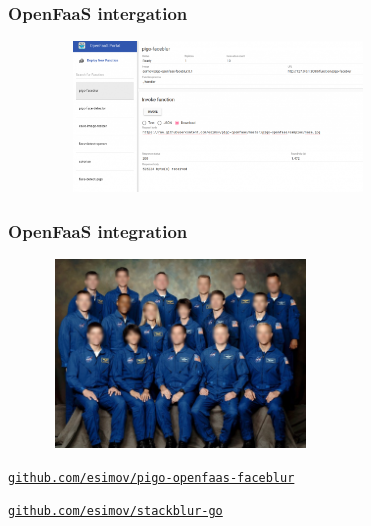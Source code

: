 \documentclass[9pt]{beamer}
\newcommand{\myblue} [1] {{\color{blue}#1}}
\begin{document}
\begin{frame}[fragile]
\frametitle{OpenFaaS intergation}


\begin{figure}[h]
\begin{center}
\includegraphics[width=9cm,height=4cm]{assets/pigo_openfaas-blur.png}
\end{center}

\end{figure}


\end{frame}

\begin{frame}[fragile]
\frametitle{OpenFaaS integration}


\begin{figure}[h]
\begin{center}
\includegraphics[width=7cm,height=5cm]{assets/pigo_openfaas-blur_result.jpg}
\end{center}

\end{figure}

\myblue{\href{https://github.com/esimov/pigo-openfaas-faceblur}{\texttt{github.com/esimov/pigo-openfaas-faceblur}}}

\myblue{\href{https://github.com/esimov/stackblur-go}{\texttt{github.com/esimov/stackblur-go}}}


\end{frame}
\end{document}
